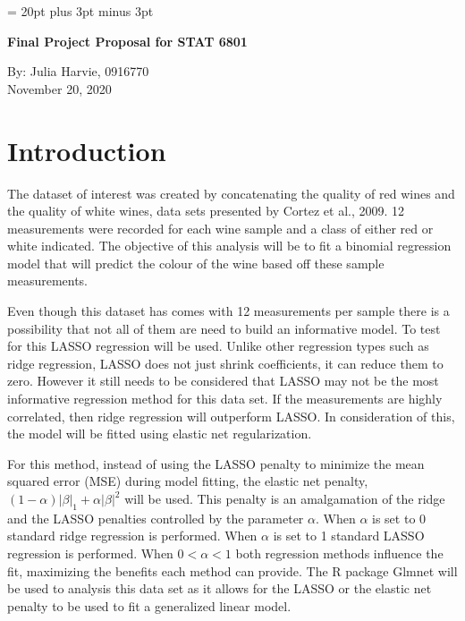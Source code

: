 \documentclass[10pt]{article}
\begin{document}
\baselineskip = 20pt plus 3pt minus 3pt

\centerline{\Large \bf Final Project Proposal for STAT 6801} 
\begin{center} By: Julia Harvie, 0916770 \\
November 20, 2020 \end{center}

\bigskip

\section{Introduction}\label{sec:intro}
The dataset of interest was created by concatenating the quality of red wines and the quality of white wines, data sets presented by Cortez et al., 2009\cite {1}. 12 measurements were recorded for each wine sample and a class of either red or white indicated. The objective of this analysis will be to fit a binomial regression model that will predict the colour of the wine based off these sample measurements.

Even though this dataset has comes with 12 measurements per sample there is a possibility that not all of them are need to build an informative model. To test for this LASSO regression will be used. Unlike other regression types such as ridge regression, LASSO does not just shrink coefficients, it can reduce them to zero. However it still needs to be considered that LASSO may not be the most informative regression method for this data set. If the measurements are highly correlated, then ridge regression will outperform LASSO\cite{2}. In consideration of this, the model will be fitted using elastic net regularization.

For this method, instead of using the LASSO penalty to minimize the mean squared error (MSE) during model fitting, the elastic net penalty, $ (1 - \alpha)|\beta|_1+\alpha|\beta|^2 $ will be used\cite{2}. This penalty is an amalgamation of the ridge and the LASSO penalties controlled by the parameter $\alpha$. When $\alpha$ is set to 0 standard ridge regression is performed. When $\alpha$ is set to 1 standard LASSO regression is performed. When $0<\alpha<1$ both regression methods influence the fit, maximizing the benefits each method can provide.  The R package Glmnet will be used to analysis this data set as it allows for the LASSO or the elastic net penalty to be used to fit a generalized linear model\cite{3}.
\end{document}
